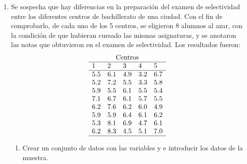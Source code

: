 \begin {enumerate}[leftmargin=*]
\begin{enumerate}
\item Dibujar el gráfico de los intervalos de confianza para la media de cada tratamiento. 
\begin{indicacion}{
\begin{enumerate}
\item Seleccionar el menú .
\item En el cuadro de diálogo que aparece, seleccionar la variable  en el campo  y seleccionar la variable  en el campo .
\item Seleccionar la opción  y hacer click sobre el botón .
\end{enumerate}}
\end{indicacion}
\end{enumerate}


\item Se sospecha que hay diferencias en la preparación del examen de selectividad entre los diferentes centros de
bachillerato de una ciudad.
Con el fin de comprobarlo, de cada uno de los 5 centros, se eligieron 8 alumnos al azar, con la condición de que
hubieran cursado las mismas asignaturas, y se anotaron las notas que obtuvieron en el examen de selectividad. 
Los resultados fueron:
\[
\begin{array}{lllll}
\multicolumn{5}{c}{\text{Centros}} \\
\hline
1 & 2 & 3 & 4 & 5 \\
\hline
5.5 & 6.1 & 4.9 & 3.2 & 6.7 \\
5.2 & 7.2 & 5.5 & 3.3 & 5.8 \\
5.9 & 5.5 & 6.1 & 5.5 & 5.4 \\
7.1 & 6.7 & 6.1 & 5.7 & 5.5 \\
6.2 & 7.6 & 6.2 & 6.0 & 4.9 \\
5.9 & 5.9 & 6.4 & 6.1 & 6.2 \\
5.3 & 8.1 & 6.9 & 4.7 & 6.1 \\
6.2 & 8.3 & 4.5 & 5.1 & 7.0 \\
\hline
\end{array}
\]

\begin{enumerate}
\item Crear un conjunto de datos con las variables  y  e introducir los datos de la muestra.


\end{enumerate}
\end{enumerate}
